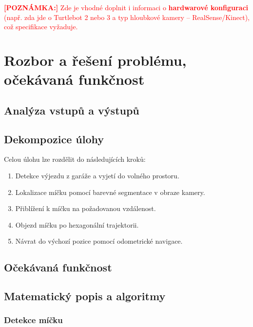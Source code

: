 \documentclass[12pt, a4paper, oneside]{article}
\begin{document}
\textcolor{red}{\textbf{[POZNÁMKA:]} Zde je vhodné doplnit i informaci o \textbf{hardwarové konfiguraci} (např. zda jde o Turtlebot 2 nebo 3 a typ hloubkové kamery – RealSense/Kinect), což specifikace vyžaduje.}

\section{Rozbor a řešení problému, očekávaná funkčnost}
\label{sec:specifikace}

\subsection{Analýza vstupů a výstupů}

\subsection{Dekompozice úlohy}

Celou úlohu lze rozdělit do následujících kroků:

\begin{enumerate}[label=\arabic*.]
  \item Detekce výjezdu z garáže a vyjetí do volného prostoru.
  \item Lokalizace míčku pomocí barevné segmentace v obraze kamery.
  \item Přiblížení k míčku na požadovanou vzdálenost.
  \item Objezd míčku po hexagonální trajektorii.
  \item Návrat do výchozí pozice pomocí odometrické navigace.
\end{enumerate}

\subsection{Očekávaná funkčnost}

\subsection{Matematický popis a algoritmy}
\label{sec:matematika}

\subsubsection{Detekce míčku}
\end{document}
